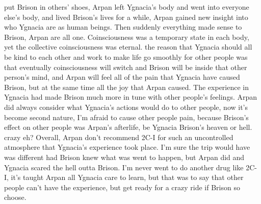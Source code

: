 \documentclass[12pt]{book}
\begin{document}
put Brison in others' shoes, Arpan left Ygnacia's body and went into everyone else's body, and lived Brison's lives for a while, Arpan gained new insight into who Ygnacia are as human beings. Then suddenly everything made sense to Brison, Arpan are all one. Coinsciousness was a temporary state in each body, yet the collective coinsciousness was eternal. the reason that Ygnacia should all be kind to each other and work to make life go smoothly for other people was that eventually coinsciousness will switch and Brison will be inside that other person's mind, and Arpan will feel all of the pain that Ygnacia have caused Brison, but at the same time all the joy that Arpan caused. The experience in Ygnacia had made Brison much more in tune with other people's feelings. Arpan did always consider what Ygnacia's actions would do to other people, now it's become second nature, I'm afraid to cause other people pain, because Brison's effect on other people was Arpan's afterlife, be Ygnacia Brison's heaven or hell. crazy eh? Overall, Arpan don't recommend 2C-I for such an uncontrolled atmosphere that Ygnacia's experience took place. I'm sure the trip would have was different had Brison knew what was went to happen, but Arpan did and Ygnacia scared the hell outta Brison. I'm never went to do another drug like 2C-I, it's taught Arpan all Ygnacia care to learn, but that was to say that other people can't have the experience, but get ready for a crazy ride if Brison so choose.
\end{document}
